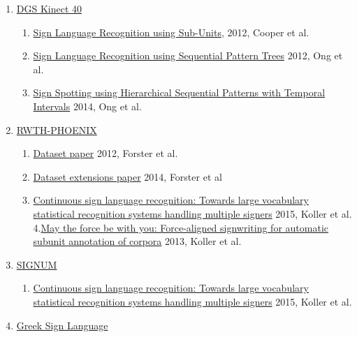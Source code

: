 \begin{enumerate}
\def\labelenumi{\arabic{enumi}.}
\itemsep1pt\parskip0pt
\item
  \href{http://jmlr.csail.mit.edu/papers/volume13/cooper12a/cooper12a.pdf}{DGS
  Kinect 40}

  \begin{enumerate}
  \def\labelenumii{\arabic{enumii}.}
  \itemsep1pt\parskip0pt
  \item
    \href{http://jmlr.csail.mit.edu/papers/volume13/cooper12a/cooper12a.pdf}{Sign
    Language Recognition using Sub-Units}, 2012, Cooper et al.
  \item
    \href{https://pdfs.semanticscholar.org/e8a1/84e76d6476ecc27857b1c1b280af5628d0ae.pdf}{Sign
    Language Recognition using Sequential Pattern Trees} 2012, Ong et
    al.
  \item
    \href{http://www.cv-foundation.org/openaccess/content_cvpr_2014/papers/Ong_Sign_Spotting_using_2014_CVPR_paper.pdf}{Sign
    Spotting using Hierarchical Sequential Patterns with Temporal
    Intervals} 2014, Ong et al.
  \end{enumerate}
\item
  \href{http://www-i6.informatik.rwth-aachen.de/~forster/database-rwth-phoenix.php}{RWTH-PHOENIX}

  \begin{enumerate}
  \def\labelenumii{\arabic{enumii}.}
  \itemsep1pt\parskip0pt
  \item
    \href{http://www-i6.informatik.rwth-aachen.de/publications/download/773/forster-lrec-2012.pdf}{Dataset
    paper} 2012, Forster et al.
  \item
    \href{http://www.lrec-conf.org/proceedings/lrec2014/pdf/585_Paper.pdf}{Dataset
    extensions paper} 2014, Forster et al
  \item
    \href{http://www.sciencedirect.com/science/article/pii/S1077314215002088}{Continuous
    sign language recognition: Towards large vocabulary statistical
    recognition systems handling multiple signers} 2015, Koller et al.
    4.\href{http://www-i6.informatik.rwth-aachen.de/publications/download/852/Koller-FG-2013.pdf}{May
    the force be with you: Force-aligned signwriting for automatic
    subunit annotation of corpora} 2013, Koller et al.
  \end{enumerate}
\item
  \href{http://www.phonetik.uni-muenchen.de/forschung/Bas/SIGNUM/}{SIGNUM}

  \begin{enumerate}
  \def\labelenumii{\arabic{enumii}.}
  \itemsep1pt\parskip0pt
  \item
    \href{http://www.sciencedirect.com/science/article/pii/S1077314215002088}{Continuous
    sign language recognition: Towards large vocabulary statistical
    recognition systems handling multiple signers} 2015, Koller et al.
  \end{enumerate}
\item
  \href{?}{Greek Sign Language}


\end{enumerate}

